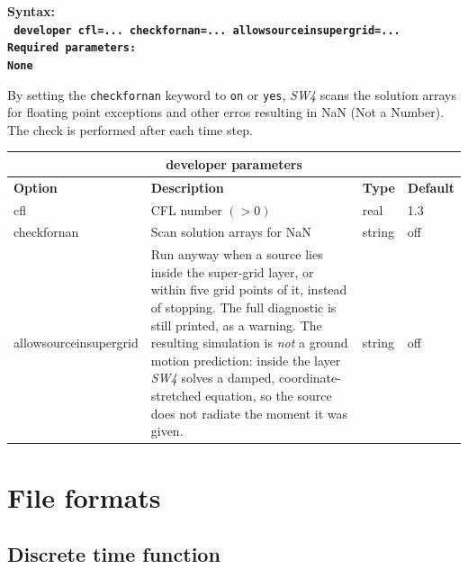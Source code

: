 \documentclass[11pt]{report}
\begin{document}
{\begin{flushleft}\bf
	Syntax:\\
	\tt
	developer
	cfl=... checkfornan=... allowsourceinsupergrid=... \\
	\bf Required parameters:\\
	\rm
	None
\end{flushleft}
By setting the \verb+checkfornan+ keyword to \verb+on+ or \verb+yes+, \emph{SW4} scans the solution
arrays for floating point exceptions and other erros resulting in NaN (Not a Number). The check is
performed after each time step.
\begin{center}
	\begin{tabular}{|l|p{10cm}|l|l|} \hline
		\multicolumn{4}{|c|}{\bf developer parameters}                        \\ \hline
		\bf{Option} & \bf{Description}             & \bf{Type} & \bf{Default} \\ \hline \hline
		cfl         & CFL number $(>0)$            & real      & 1.3          \\ \hline
		checkfornan & Scan solution arrays for NaN & string    & off          \\ \hline
		allowsourceinsupergrid & Run anyway when a source lies inside the
		super-grid layer, or within five grid points of it, instead of stopping.
		The full diagnostic is still printed, as a warning. The resulting
		simulation is {\em not} a ground motion prediction: inside the layer
		\emph{SW4} solves a damped, coordinate-stretched equation, so the source
		does not radiate the moment it was given.
		            & string    & off
		\\ \hline
	\end{tabular}
\end{center}

\chapter{File formats}\label{chap:formats}


\section{Discrete time function}\label{sec:discrete-time-function-format}

}
\end{document}
